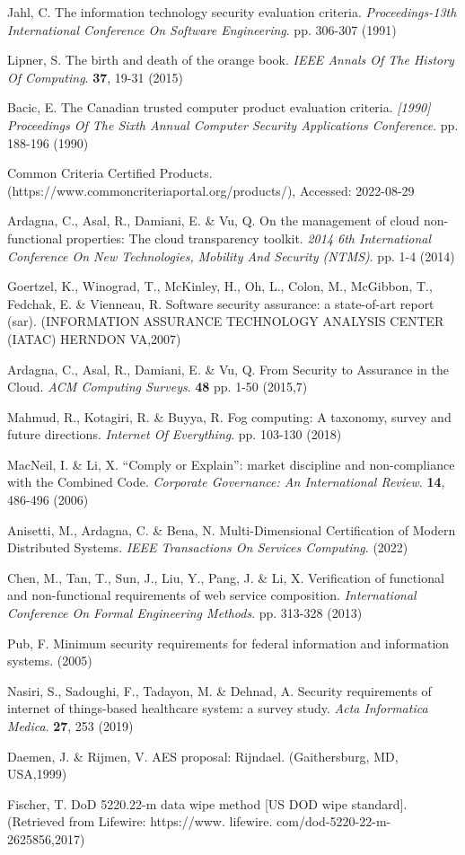 Jahl, C. The information technology security evaluation criteria. {\em Proceedings-13th International Conference On Software Engineering}. pp. 306-307 (1991)

Lipner, S. The birth and death of the orange book. {\em IEEE Annals Of The History Of Computing}. \textbf{37}, 19-31 (2015)

Bacic, E. The Canadian trusted computer product evaluation criteria. {\em [1990] Proceedings Of The Sixth Annual Computer Security Applications Conference}. pp. 188-196 (1990)

Common Criteria Certified Products. (https://www.commoncriteriaportal.org/products/), Accessed: 2022-08-29

Ardagna, C., Asal, R., Damiani, E. \& Vu, Q. On the management of cloud non-functional properties: The cloud transparency toolkit. {\em 2014 6th International Conference On New Technologies, Mobility And Security (NTMS)}. pp. 1-4 (2014)

Goertzel, K., Winograd, T., McKinley, H., Oh, L., Colon, M., McGibbon, T., Fedchak, E. \& Vienneau, R. Software security assurance: a state-of-art report (sar). (INFORMATION ASSURANCE TECHNOLOGY ANALYSIS CENTER (IATAC) HERNDON VA,2007)

Ardagna, C., Asal, R., Damiani, E. \& Vu, Q. From Security to Assurance in the Cloud. {\em ACM Computing Surveys}. \textbf{48} pp. 1-50 (2015,7)

Mahmud, R., Kotagiri, R. \& Buyya, R. Fog computing: A taxonomy, survey and future directions. {\em Internet Of Everything}. pp. 103-130 (2018)

MacNeil, I. \& Li, X. “Comply or Explain”: market discipline and non-compliance with the Combined Code. {\em Corporate Governance: An International Review}. \textbf{14}, 486-496 (2006)

Anisetti, M., Ardagna, C. \& Bena, N. Multi-Dimensional Certification of Modern Distributed Systems. {\em IEEE Transactions On Services Computing}. (2022)

Chen, M., Tan, T., Sun, J., Liu, Y., Pang, J. \& Li, X. Verification of functional and non-functional requirements of web service composition. {\em International Conference On Formal Engineering Methods}. pp. 313-328 (2013)

Pub, F. Minimum security requirements for federal information and information systems.  (2005)

Nasiri, S., Sadoughi, F., Tadayon, M. \& Dehnad, A. Security requirements of internet of things-based healthcare system: a survey study. {\em Acta Informatica Medica}. \textbf{27}, 253 (2019)

Daemen, J. \& Rijmen, V. AES proposal: Rijndael. (Gaithersburg, MD, USA,1999)

Fischer, T. DoD 5220.22-m data wipe method [US DOD wipe standard]. (Retrieved from Lifewire: https://www. lifewire. com/dod-5220-22-m-2625856,2017)
